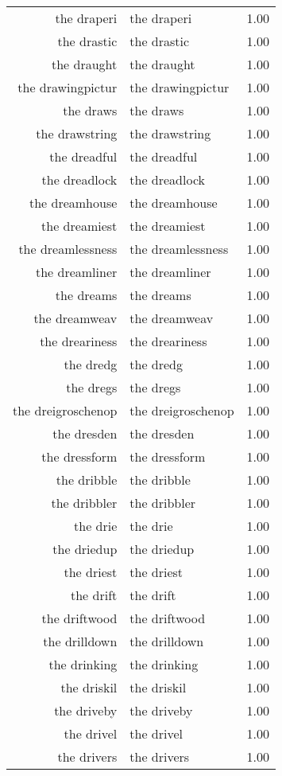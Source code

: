 \begin{table}[ht]
\begin{tabular}{rlr}
  the draperi & the draperi & 1.00 \\ 
  the drastic & the drastic & 1.00 \\ 
  the draught & the draught & 1.00 \\ 
  the drawingpictur & the drawingpictur & 1.00 \\ 
  the draws & the draws & 1.00 \\ 
  the drawstring & the drawstring & 1.00 \\ 
  the dreadful & the dreadful & 1.00 \\ 
  the dreadlock & the dreadlock & 1.00 \\ 
  the dreamhouse & the dreamhouse & 1.00 \\ 
  the dreamiest & the dreamiest & 1.00 \\ 
  the dreamlessness & the dreamlessness & 1.00 \\ 
  the dreamliner & the dreamliner & 1.00 \\ 
  the dreams & the dreams & 1.00 \\ 
  the dreamweav & the dreamweav & 1.00 \\ 
  the dreariness & the dreariness & 1.00 \\ 
  the dredg & the dredg & 1.00 \\ 
  the dregs & the dregs & 1.00 \\ 
  the dreigroschenop & the dreigroschenop & 1.00 \\ 
  the dresden & the dresden & 1.00 \\ 
  the dressform & the dressform & 1.00 \\ 
  the dribble & the dribble & 1.00 \\ 
  the dribbler & the dribbler & 1.00 \\ 
  the drie & the drie & 1.00 \\ 
  the driedup & the driedup & 1.00 \\ 
  the driest & the driest & 1.00 \\ 
  the drift & the drift & 1.00 \\ 
  the driftwood & the driftwood & 1.00 \\ 
  the drilldown & the drilldown & 1.00 \\ 
  the drinking & the drinking & 1.00 \\ 
  the driskil & the driskil & 1.00 \\ 
  the driveby & the driveby & 1.00 \\ 
  the drivel & the drivel & 1.00 \\ 
  the drivers & the drivers & 1.00 \\ 

\end{tabular}
\end{table}
